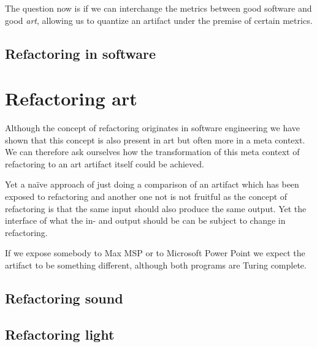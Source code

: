 \documentclass[10pt,twocolumn,letterpaper]{article}
\begin{document}
The question now is if we can interchange the metrics between good software and good \textit{art}, allowing
us to quantize an artifact under the premise of certain metrics.

\subsection{Refactoring in software}

\section{Refactoring art}

Although the concept of refactoring originates in software engineering we have shown that this concept is also
present in art but often more in a meta context.
We can therefore ask ourselves how the transformation of this meta context of refactoring to an art artifact itself
could be achieved.

Yet a naïve approach of just doing a comparison of an artifact which has been exposed to refactoring and another one
not is not fruitful as the concept of refactoring is that the same input should also produce the same output.
Yet the interface of what the in- and output should be can be subject to change in refactoring.

If we expose somebody to Max MSP or to Microsoft Power Point we expect the artifact to be something different, although
both programs are Turing complete.

\subsection{Refactoring sound}

\subsection{Refactoring light}

{\small


}
\end{document}
